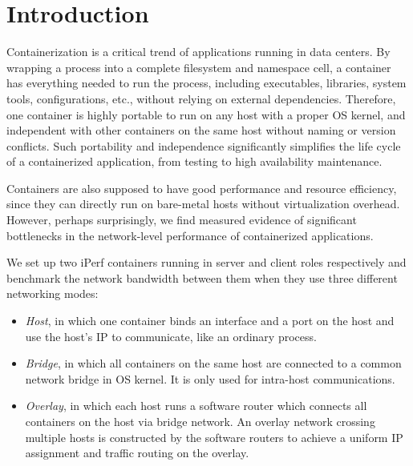 \section{Introduction} \label{sec:introduction}


Containerization is a critical trend of applications running in data centers.
By wrapping a process into a complete filesystem and namespace cell, a container
has everything needed to run the process, including executables, libraries, system
tools, configurations, etc., without relying on external dependencies. 
Therefore, one container
is highly portable to run on any host with a proper OS kernel, and independent
with other containers on the same host without naming or version conflicts.
Such portability and independence significantly simplifies the life cycle of
a containerized application, from testing to high availability maintenance.

Containers are also supposed to have good performance and resource efficiency,
since they can directly run on bare-metal hosts without virtualization overhead.
However, perhaps surprisingly, we find measured evidence of significant bottlenecks in the 
network-level performance of containerized applications. 


We set up two iPerf containers running in server and client roles respectively and benchmark the network bandwidth between them when they use three different networking modes:
\begin{itemize}
	\item {\em Host}, in which one container binds an interface
and a port on the host and use the host's IP to communicate, like an ordinary
process.
	\item {\em Bridge}, in which all containers on the same host are connected to a common network bridge in OS kernel. It is only used for
	intra-host communications.  
	\item {\em Overlay}, in which each host runs a software router which
	connects all containers on the host via bridge network. An overlay 
	network crossing multiple hosts is constructed by the software routers
	to achieve a uniform IP assignment and traffic routing on the overlay.
\end{itemize}

